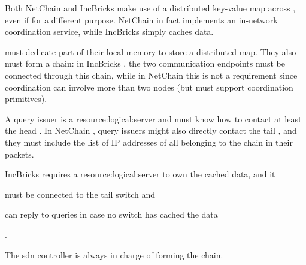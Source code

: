 Both NetChain \cite{netchain} and IncBricks \cite{incbricks} make use of a distributed key-value map across , even if for a different purpose.
NetChain \cite{netchain} in fact implements an in-network coordination service, while IncBricks \cite{incbricks} simply caches data.

 must dedicate part of their local memory to store a distributed map.
They also must form a chain: in IncBricks \cite{incbricks}, the two communication endpoints must be connected through this chain, while in NetChain \cite{netchain} this is not a requirement since coordination can involve more than two nodes (but  must support coordination primitives).

A query issuer is a \gls{resource:logical:server} and must know how to contact at least the head .
In NetChain \cite{netchain}, query issuers might also directly contact the tail , and they must include the list of IP addresses of all  belonging to the chain in their packets.

IncBricks \cite{incbricks} requires a \gls{resource:logical:server} to own the cached data, and it
\begin{mylist}
    \item must be connected to the tail switch and
    \item can reply to queries in case no switch has cached the data
\end{mylist}.

The \gls{sdn} controller is always in charge of forming the  chain.